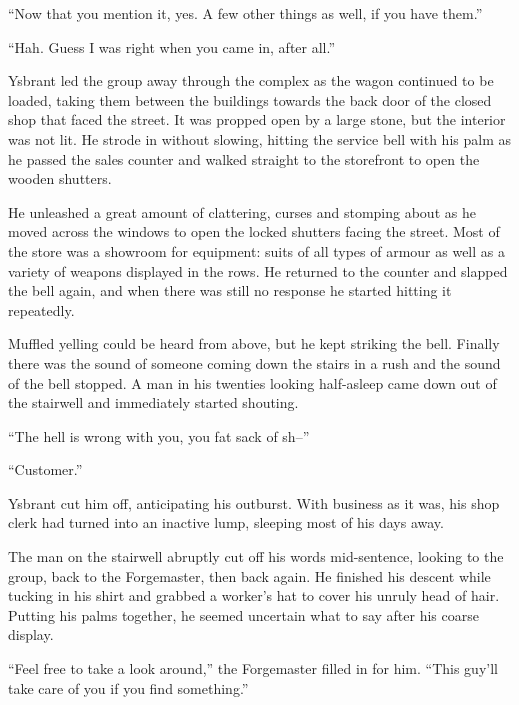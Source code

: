  

“Now that you mention it, yes. A few other things as well, if you have them.”

 

“Hah. Guess I was right when you came in, after all.”

 

Ysbrant led the group away through the complex as the wagon continued to be loaded, taking them between the buildings towards the back door of the closed shop that faced the street. It was propped open by a large stone, but the interior was not lit. He strode in without slowing, hitting the service bell with his palm as he passed the sales counter and walked straight to the storefront to open the wooden shutters.

 

He unleashed a great amount of clattering, curses and stomping about as he moved across the windows to open the locked shutters facing the street. Most of the store was a showroom for equipment: suits of all types of armour as well as a variety of weapons displayed in the rows. He returned to the counter and slapped the bell again, and when there was still no response he started hitting it repeatedly.

 

Muffled yelling could be heard from above, but he kept striking the bell. Finally there was the sound of someone coming down the stairs in a rush and the sound of the bell stopped. A man in his twenties looking half-asleep came down out of the stairwell and immediately started shouting.

 

“The hell is wrong with you, you fat sack of sh–”

 

“Customer.”

 

Ysbrant cut him off, anticipating his outburst. With business as it was, his shop clerk had turned into an inactive lump, sleeping most of his days away.

 

The man on the stairwell abruptly cut off his words mid-sentence, looking to the group, back to the Forgemaster, then back again. He finished his descent while tucking in his shirt and grabbed a worker’s hat to cover his unruly head of hair. Putting his palms together, he seemed uncertain what to say after his coarse display.

 

“Feel free to take a look around,” the Forgemaster filled in for him. “This guy’ll take care of you if you find something.”

